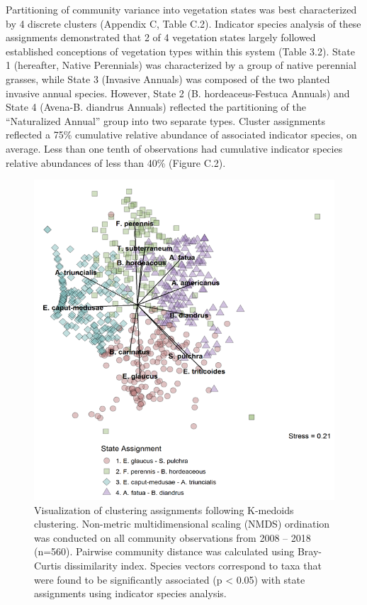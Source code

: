 \documentclass[twoside,12pt,final]{ucthesis-CA2012}
\begin{document}
\begin{ucmainmatter}
Partitioning of community variance into vegetation states was best characterized by 4 discrete clusters (Appendix C, Table C.2).
Indicator species analysis of these assignments demonstrated that 2 of 4 vegetation states largely followed established conceptions of vegetation types within this system (Table 3.2).
State 1 (hereafter, Native Perennials) was characterized by a group of native perennial grasses, while State 3 (Invasive Annuals) was composed of the two planted invasive annual species.
However, State 2 (B. hordeaceus-Festuca Annuals) and State 4 (Avena-B. diandrus Annuals) reflected the partitioning of the ``Naturalized Annual'' group into two separate types.
Cluster assignments reflected a 75\% cumulative relative abundance of associated indicator species, on average. Less than one tenth of observations had cumulative indicator species relative abundances of less than 40\% (Figure C.2).
\begin{figure}
\centering
\includegraphics[width=1\textwidth,height=0.8\textheight]{figure/Fig3_2.png}
\caption{Visualization of clustering assignments following K-medoids clustering. Non-metric multidimensional scaling (NMDS) ordination was conducted on all community observations from 2008 -- 2018 (n=560). Pairwise community distance was calculated using Bray-Curtis dissimilarity index. Species vectors correspond to taxa that were found to be significantly associated (p \textless{} 0.05) with state assignments using indicator species analysis. \label{fig-3-1}}

\end{figure}
\end{ucmainmatter}
\end{document}
